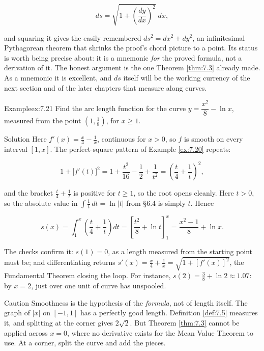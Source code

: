 \documentclass[a4paper,12pt,oneside]{memoir}
\begin{document}
\[ ds = \sqrt{1 + \left(\frac{dy}{dx}\right)^{2}}\;dx, \]

and squaring it gives the easily remembered \emph{\(ds^{2} = dx^{2} + dy^{2}\)}, an infinitesimal Pythagorean theorem that shrinks the proof’s chord picture to a point. Its status is worth being precise about: it is a mnemonic \emph{for} the proved formula, not a derivation of it. The honest argument is the one Theorem \ref{thm:7.3} already made. As a mnemonic it is excellent, and \(ds\) itself will be the working currency of the next section and of the later chapters that measure along curves.

\begin{workedexample}
\begin{envexample}{Example}{ex:7.21}{}
Find the arc length function for the curve \(y = \dfrac{x^{2}}{8} - \ln x\), measured from the point \((1, \tfrac{1}{8})\), for \(x \ge 1\).
\end{envexample}
\begin{envsolution}{Solution}{}{}
Here \(f'(x) = \tfrac{x}{4} - \tfrac{1}{x}\), continuous for \(x > 0\), so \(f\) is smooth on every interval \([1, x]\). The perfect-square pattern of Example \ref{ex:7.20} repeats:

\[ 1 + \bigl[f'(t)\bigr]^{2} = 1 + \frac{t^{2}}{16} - \frac{1}{2} + \frac{1}{t^{2}} = \left(\frac{t}{4} + \frac{1}{t}\right)^{2}, \]

and the bracket \(\tfrac{t}{4} + \tfrac{1}{t}\) is positive for \(t \ge 1\), so the root opens cleanly. Here \(t > 0\), so the absolute value in \(\int \tfrac{1}{t}\,dt = \ln\lvert t\rvert\) from §6.4 is simply \(t\). Hence

\[ s(x) = \int_{1}^{x} \left(\frac{t}{4} + \frac{1}{t}\right) dt = \left[\frac{t^{2}}{8} + \ln t\right]_{1}^{x} = \frac{x^{2} - 1}{8} + \ln x. \]

The checks confirm it: \(s(1) = 0\), as a length measured from the starting point must be; and differentiating returns \(s'(x) = \tfrac{x}{4} + \tfrac{1}{x} = \sqrt{1 + [f'(x)]^{2}}\), the Fundamental Theorem closing the loop. For instance, \(s(2) = \tfrac{3}{8} + \ln 2 \approx 1.07\): by \(x = 2\), just over one unit of curve has unspooled. \qedmark
\end{envsolution}
\end{workedexample}
\begin{envcaution}{Caution}{}{}
Smoothness is the hypothesis of the \emph{formula}, not of length itself. The graph of \(\lvert x\rvert\) on \([-1, 1]\) has a perfectly good length. Definition \ref{def:7.5} measures it, and splitting at the corner gives \(2\sqrt{2}\). But Theorem \ref{thm:7.3} cannot be applied across \(x = 0\), where no derivative exists for the Mean Value Theorem to use. At a corner, split the curve and add the pieces.
\end{envcaution}
\end{document}
